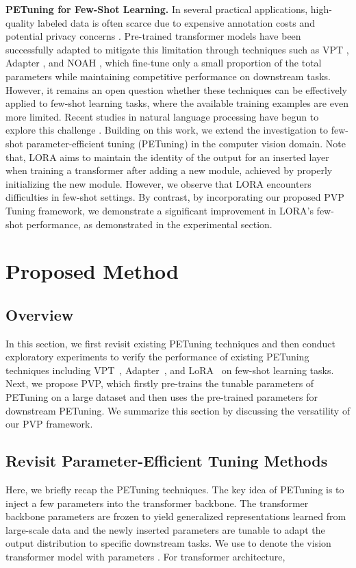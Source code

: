 \documentclass[10pt,journal,letterpaper,compsoc]{IEEEtran}
\begin{document}
\textbf{PETuning for Few-Shot Learning.} In several practical applications, high-quality labeled data is often scarce due to expensive annotation costs and potential privacy concerns \cite{hu2021sqn, hu2022sensaturban}. Pre-trained transformer models have been successfully adapted to mitigate this limitation through techniques such as VPT \cite{vpt}, Adapter \cite{adapter}, and NOAH \cite{NOAH}, which fine-tune only a small proportion of the total parameters while maintaining competitive performance on downstream tasks. However, it remains an open question whether these techniques can be effectively applied to few-shot learning tasks, where the available training examples are even more limited. Recent studies in natural language processing have begun to explore this challenge \cite{ppt, 2021Cutting, VirtualPPT, Meta-Adapters, DBLP:conf/acl/0016TYXS022, DBLP:conf/acl/CuiHDHL22}. Building on this work, we extend the investigation to few-shot parameter-efficient tuning (PETuning) in the computer vision domain. Note that, LORA \cite{Lora} aims to maintain the identity of the output for an inserted layer when training a transformer after adding a new module, achieved by properly initializing the new module. However, we observe that LORA encounters difficulties in few-shot settings. By contrast, by incorporating our proposed PVP Tuning framework, we demonstrate a significant improvement in LORA's few-shot performance, as demonstrated in the experimental section.




\section{Proposed Method}

\subsection{Overview}

In this section, we first revisit existing PETuning techniques and then conduct exploratory experiments to verify the performance of existing PETuning techniques including VPT~\cite{vpt}, Adapter~\cite{adapter}, and LoRA~\cite{Lora} on few-shot learning tasks. Next, we propose PVP, which firstly pre-trains the tunable parameters of PETuning on a large dataset and then uses the pre-trained parameters for downstream PETuning. We summarize this section by discussing the versatility of our PVP framework.

\subsection{Revisit Parameter-Efficient Tuning Methods}
Here, we briefly recap the PETuning techniques. The key idea of PETuning is to inject a few parameters into the transformer backbone. The transformer backbone parameters are frozen to yield generalized representations learned from large-scale data and the newly inserted parameters are tunable to adapt the output distribution to specific downstream tasks. We use  to denote the vision transformer model with parameters . For transformer architecture,
\end{document}
